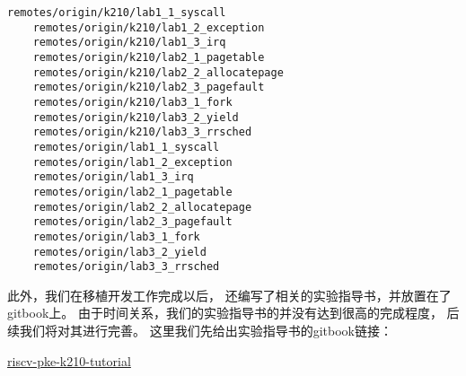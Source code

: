 \begin{lstlisting}[caption={分支列表}, label={lst:branch_list_1}]
    remotes/origin/k210/lab1_1_syscall
    remotes/origin/k210/lab1_2_exception
    remotes/origin/k210/lab1_3_irq
    remotes/origin/k210/lab2_1_pagetable
    remotes/origin/k210/lab2_2_allocatepage
    remotes/origin/k210/lab2_3_pagefault
    remotes/origin/k210/lab3_1_fork
    remotes/origin/k210/lab3_2_yield
    remotes/origin/k210/lab3_3_rrsched
    remotes/origin/lab1_1_syscall
    remotes/origin/lab1_2_exception
    remotes/origin/lab1_3_irq
    remotes/origin/lab2_1_pagetable
    remotes/origin/lab2_2_allocatepage
    remotes/origin/lab2_3_pagefault
    remotes/origin/lab3_1_fork
    remotes/origin/lab3_2_yield
    remotes/origin/lab3_3_rrsched
\end{lstlisting}

此外，我们在移植开发工作完成以后，
还编写了相关的实验指导书，并放置在了gitbook上。
由于时间关系，我们的实验指导书的并没有达到很高的完成程度，
后续我们将对其进行完善。
这里我们先给出实验指导书的gitbook链接：

\href{https://1621184422.gitbook.io/pke-k210-tutorial}{riscv-pke-k210-tutorial}